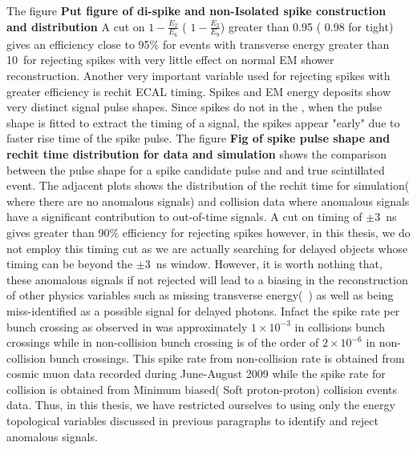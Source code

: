 The figure {\textbf{Put figure of di-spike and non-Isolated spike construction and distribution}}  
A cut on $ 1 - \frac{E_{2}}{E_{6}} $ ( $ 1 - \frac{E_{2}}{E_{9}} $)  greater than 0.95 ( 0.98 for tight) gives an efficiency close to 95\% for events with transverse energy greater than 10~\GeV for rejecting spikes with very little effect on normal EM shower reconstruction.
\newline
Another very important variable used for rejecting spikes with greater efficiency is rechit ECAL timing. Spikes and EM energy deposits show very distinct signal pulse shapes. Since spikes do not  in the \pb , when the pulse shape is fitted to extract the timing of a signal, the spikes appear "early" due to faster rise time of the spike pulse.
The figure {\textbf{Fig of spike pulse shape and rechit time distribution for data and simulation}} shows the comparison between the pulse shape for a spike candidate pulse and and true \pb scintillated event. The adjacent plots shows the distribution of the rechit time for simulation( where  there are no anomalous signals) and collision data where anomalous signals have a significant contribution to out-of-time signals.%
A cut on timing of $ \pm 3$~ns gives greater than 90\% efficiency for rejecting spikes however, in this thesis, we do not employ this timing cut as we are actually searching for delayed objects whose timing can be beyond the $\pm 3$~ns window.
\newline
However, it is worth nothing that, these anomalous signals if not rejected will lead to a biasing in the reconstruction of other physics variables such as missing transverse energy(~\MET) as well as being miss-identified as a possible signal for delayed photons.
Infact the spike rate per bunch crossing as observed in \cite{spike2} was approximately $ 1 \times 10^{-3}$ in collisions bunch crossings while in non-collision bunch crossing is of the order of $2 \times 10^{-6}$ in non-collision bunch crossings. This spike rate from non-collision rate is obtained from cosmic muon data recorded during June-August 2009 while the spike rate for collision is obtained from Minimum biased( Soft proton-proton) collision events data.
Thus, in this thesis, we have restricted ourselves to using only the energy topological variables discussed in previous paragraphs to identify and reject anomalous signals.
